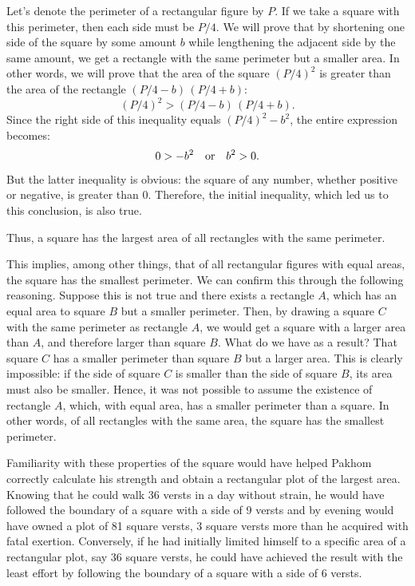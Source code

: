 Let's denote the perimeter of a rectangular figure by \( P \). If we take a square with this perimeter, then each side must be \( P/4 \). We will prove that by shortening one side of the square by some amount \( b \) while lengthening the adjacent side by the same amount, we get a rectangle with the same perimeter but a smaller area. In other words, we will prove that the area of the square \( (P/4)^{2} \) is greater than the area of the rectangle \( (P/4 - b)\,(P/4 + b) \):
\begin{equation*}%
 (P/4)^{2} > (P/4 - b)\,(P/4 + b).
\end{equation*}
Since the right side of this inequality equals \( (P/4)^{2} - b^{2} \), the entire expression becomes:
\begin{equation*}%
 0 > -b^{2} \qor b^{2} > 0.
\end{equation*}
But the latter inequality is obvious: the square of any number, whether positive or negative, is greater than 0. Therefore, the initial inequality, which led us to this conclusion, is also true.

Thus, a square has the largest area of all rectangles with the same perimeter.

This implies, among other things, that of all rectangular figures with equal areas, the square has the smallest perimeter. We can confirm this through the following reasoning. Suppose this is not true and there exists a rectangle $A$, which has an equal area to square $B$ but a smaller perimeter. Then, by drawing a square $C$ with the same perimeter as rectangle $A$, we would get a square with a larger area than $A$, and therefore larger than square $B$. What do we have as a result? That square $C$ has a smaller perimeter than square $B$ but a larger area. This is clearly impossible: if the side of square $C$ is smaller than the side of square $B$, its area must also be smaller. Hence, it was not possible to assume the existence of rectangle $A$, which, with equal area, has a smaller perimeter than a square. In other words, of all rectangles with the same area, the square has the smallest perimeter.

Familiarity with these properties of the square would have helped Pakhom correctly calculate his strength and obtain a rectangular plot of the largest area. Knowing that he could walk 36 versts in a day without strain, he would have followed the boundary of a square with a side of 9 versts and by evening would have owned a plot of 81 square versts, 3 square versts more than he acquired with fatal exertion. Conversely, if he had initially limited himself to a specific area of a rectangular plot, say 36 square versts, he could have achieved the result with the least effort by following the boundary of a square with a side of 6 versts.

